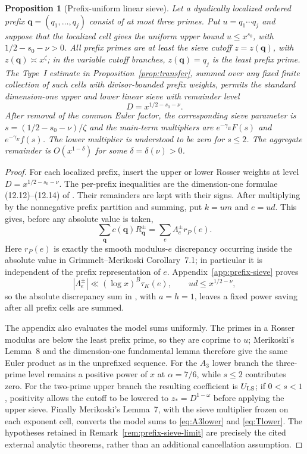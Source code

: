 \documentclass[10pt,reqno]{amsart}
\newcommand{\1}{\mathbf{1}}
\theoremstyle{plain}
\newtheorem{proposition}[theorem]{Proposition}
\theoremstyle{remark}
\begin{document}
\begin{proposition}[Prefix-uniform linear sieve]\label{prop:prefix-sieve}
Let a dyadically localized ordered prefix
$\boldsymbol q=(q_1,\ldots,q_j)$ consist of at most three primes.  Put
$u=q_1\cdots q_j$ and suppose that the localized cell gives the uniform
upper bound $u\le x^{s_0}$, with $1/2-s_0-\nu>0$.  All prefix primes are at least the sieve cutoff
$z=z(\boldsymbol q)$, with $z(\boldsymbol q)\asymp x^\zeta$; in the variable
cutoff branches, $z(\boldsymbol q)=q_j$ is the least prefix prime.  The
Type~I estimate in Proposition~\ref{prop:transfer}, summed over any fixed
finite collection of such cells with divisor-bounded prefix weights, permits
the standard dimension-one upper and lower linear sieve with remainder level
\[
 D=x^{1/2-s_0-\nu}.
\]
After removal of the common Euler factor, the corresponding sieve parameter
is $s=(1/2-s_0-\nu)/\zeta$ and the main-term multipliers are
$e^{-\gamma_E}F(s)$ and $e^{-\gamma_E}f(s)$.  The lower multiplier is
understood to be zero for $s\le2$.  The aggregate remainder is
$O(x^{1-\delta})$ for some $\delta=\delta(\nu)>0$.
\end{proposition}

\begin{proof}
For each localized prefix, insert the upper or lower Rosser weights at
level \(D=x^{1/2-s_0-\nu}\).  The per-prefix inequalities are the
dimension-one formulae (12.12)--(12.14) of
\cite[Chapter 12, pp. 235--236]{FriedlanderIwaniec2010}.  Their remainders
are kept with their signs.  After multiplying by the nonnegative prefix
partition and summing, put \(k=um\) and \(e=ud\).  This gives, before any
absolute value is taken,
\[
 \sum_{\boldsymbol q}c(\boldsymbol q)R_{\boldsymbol q}^{\pm}
 =\sum_e\Lambda_e^\pm r_P(e).
\]
Here \(r_P(e)\) is exactly the smooth modulus-\(e\) discrepancy occurring
inside the absolute value in Grimmelt--Merikoski Corollary~7.1; in
particular it is independent of the prefix representation of \(e\).
Appendix~\ref{app:prefix-sieve} proves
\[
 |\Lambda_e^\pm|\ll(\log x)^B\tau_K(e),\qquad
 ud\le x^{1/2-\nu},
\]
so the absolute discrepancy sum in
\cite[Corollary 7.1, p. 22]{GrimmeltMerikoski2025}, with \(a=h=1\),
leaves a fixed power saving after all prefix cells are summed.

The appendix also evaluates the model sums uniformly.  The primes in a
Rosser modulus are below the least prefix prime, so they are coprime to
\(u\); Merikoski's Lemma~8 and the dimension-one fundamental lemma therefore
give the same Euler product as in the unprefixed sequence.  For the \(A_3\)
lower branch the three-prime level remains a positive power of \(x\) at
\(\alpha=7/6\), while \(s\le2\) contributes zero.  For the two-prime upper
branch the resulting coefficient is \(U_{\rm LS}\); if \(0<s<1\), positivity
allows the cutoff to be lowered to \(z_*=D^{1-\omega}\) before applying the
upper sieve.  Finally Merikoski's Lemma~7, with the sieve multiplier frozen
on each exponent cell, converts the model sums to \eqref{eq:A3lower} and
\eqref{eq:Tlower}.  The hypotheses retained in
Remark~\ref{rem:prefix-sieve-limit} are precisely the cited external
analytic theorems, rather than an additional cancellation assumption.
\end{proof}
\end{document}
